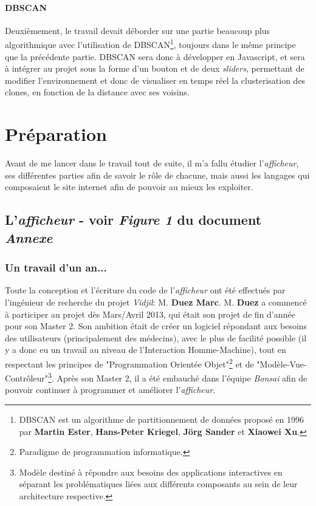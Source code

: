 \documentclass[12pt]{report}
\begin{document}
\begin{spacing}{1.2}
\subsubsection{DBSCAN}
Deuxièmement, le travail devait déborder sur une partie beaucoup plus algorithmique avec l'utilisation de DBSCAN\footnote{DBSCAN est un algorithme de partitionnement de données proposé en 1996 par \textbf{Martin Ester}, \textbf{Hans-Peter Kriegel}, \textbf{Jörg Sander} et \textbf{Xiaowei Xu}.}, toujours dans le même principe que la précédente partie.
\newline
DBSCAN sera donc à développer en Javascript, et sera à intégrer au projet sous la forme d'un bouton et de deux \textit{sliders}, permettant de modifier l'environnement et donc de visualiser en temps réel la clusterisation des clones, en fonction de la distance avec ses voisins.

\chapter{Préparation}

Avant de me lancer dans le travail tout de suite, il m'a fallu étudier l'\textit{afficheur}, ses différentes parties afin de savoir le rôle de chacune, mais aussi les langages qui composaient le site internet afin de pouvoir au mieux les exploiter.

\section{L'\textit{afficheur}  - voir \textit{Figure 1} du document \textit{Annexe}}

\subsection{Un travail d'un an...}
Toute la conception et l'écriture du code de l'\textit{afficheur} ont été effectués par l'ingénieur de recherche du projet \textit{Vidjil}: M. \textbf{Duez Marc}.
\newline
M. \textbf{Duez} a commencé à participer au projet dès Mars/Avril 2013, qui était son projet de fin d'année pour son Master 2.
\newline
Son ambition était de créer un logiciel répondant aux besoins des utilisateurs (principalement des médecins), avec le plus de facilité possible (il y a donc eu un travail au niveau de l'Interaction Homme-Machine), tout en respectant les principes de "Programmation Orientée Objet"\footnote{Paradigme de programmation informatique.} et de "Modèle-Vue-Contrôleur"\footnote{Modèle destiné à répondre aux besoins des applications interactives en séparant les problématiques liées aux différents composants au sein de leur architecture respective.}.
\newline
Après son Master 2, il a été embauché dans l'équipe \textit{Bonsai} afin de pouvoir continuer à programmer et améliorer l'\textit{afficheur}.


\end{spacing}
\end{document}
